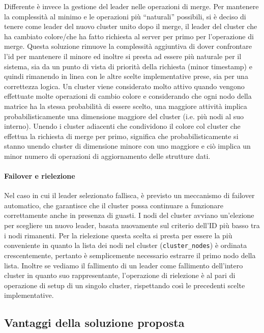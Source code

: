 \documentclass[12pt, a4paper]{report}
\begin{document}
Differente \`e invece la gestione del leader nelle operazioni di merge. Per mantenere la complessit\`a al minimo e le operazioni pi\`u ``naturali'' possibili, si \`e deciso di tenere come leader del nuovo cluster unito dopo il merge, il leader del cluster che ha cambiato colore/che ha fatto richiesta al server per primo per l'operazione di merge.
Questa soluzione rimuove la complessit\`a aggiuntiva di dover confrontare l'id per mantenere il minore ed inoltre si presta ad essere pi\`u naturale per il sistema, sia da un punto di vista di priorit\`a della richiesta (minor timestamp) e quindi rimanendo in linea con le altre scelte implementative prese, sia per una correttezza logica. Un cluster viene considerato molto attivo quando vengono effettuate molte operazioni di cambio colore e considerando che ogni nodo della matrice ha la stessa probabilit\`a di essere scelto, una maggiore attivit\`a implica probabilisticamente una dimensione maggiore del cluster (i.e. pi\`u nodi al suo interno). Unendo i cluster adiacenti che condividono il colore col cluster che effettua la richiesta di merge per primo, significa che probabilisticamente si stanno unendo cluster di dimensione minore con uno maggiore e ci\`o implica un minor numero di operazioni di aggiornamento delle strutture dati.

\paragraph{Failover e rielezione}
Nel caso in cui il leader selezionato fallisca, \`e previsto un meccanismo di failover automatico, che garantisce che il cluster possa continuare a funzionare correttamente anche in presenza di guasti. I nodi del cluster avviano un'elezione per scegliere un nuovo leader, basata nuovamente sul criterio dell'ID pi\`u basso tra i nodi rimanenti. Per la rielezione questa scelta si presta per essere la pi\`u conveniente in quanto la lista dei nodi nel cluster (\texttt{cluster\_nodes}) \`e ordinata crescentemente, pertanto \`e semplicemente necessario estrarre il primo nodo della lista. Inoltre se vediamo il fallimento di un leader come fallimento dell'intero cluster in quanto suo rappresentante, l'operazione di rielezione \`e al pari di operazione di setup di un singolo cluster, rispettando cos\`i le precedenti scelte implementative.

\subsection{Vantaggi della soluzione proposta}
\end{document}
